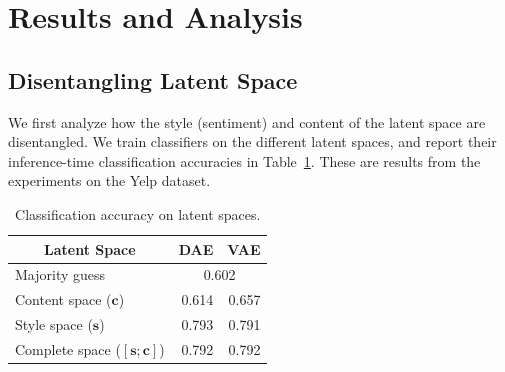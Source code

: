 \documentclass[letterpaper]{article} %
\newcommand{\tabh}[1]{\multicolumn{1}{c|}{\textbf{#1}}}
\newcommand{\tabc}[2]{\multicolumn{1}{|c||}{\multirow{#1}{*}{\textbf{#2}}}}
\begin{document}
\section{Results and Analysis}

\subsection{Disentangling Latent Space}

We first analyze how the style (sentiment) and content of the latent space are disentangled.
We train classifiers on the different latent spaces, and report their inference-time classification accuracies in Table~\ref{tab:classification}.
These are results from the experiments on the Yelp dataset.

\begin{table}[ht]
	\centering
	\begin{tabular}{| l || r | r |}
		\hline
		\tabc{1}{Latent Space}           & \tabh{DAE}                 & \tabh{VAE} \\
		\hline \hline
		Majority guess                   & \multicolumn{2}{c|}{0.602}              \\
		\hline
		Content space  ($\bm c$)         & 0.614                      & 0.657      \\ \hline
		Style space ($\bm s$)            & 0.793                      & 0.791      \\ \hline
		Complete space ($[\bm s;\bm c]$) & 0.792                      & 0.792      \\
		\hline
	\end{tabular}
	\caption{Classification accuracy on latent spaces.}
	\label{tab:classification}
\end{table}
\end{document}
